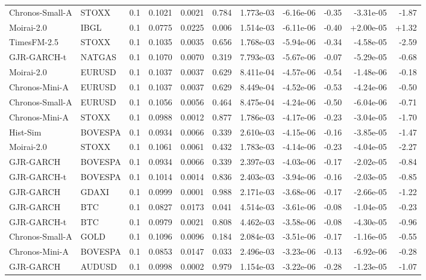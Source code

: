 \begin{tabular}{llrrrrrrrrr}
Chronos-Small-A & STOXX & 0.1 & 0.1021 & 0.0021 & 0.784 & 1.773e-03 & -6.16e-06 & -0.35 & -3.31e-05 & -1.87 \\
Moirai-2.0 & IBGL & 0.1 & 0.0775 & 0.0225 & 0.006 & 1.514e-03 & -6.11e-06 & -0.40 & +2.00e-05 & +1.32 \\
TimesFM-2.5 & STOXX & 0.1 & 0.1035 & 0.0035 & 0.656 & 1.768e-03 & -5.94e-06 & -0.34 & -4.58e-05 & -2.59 \\
GJR-GARCH-t & NATGAS & 0.1 & 0.1070 & 0.0070 & 0.319 & 7.793e-03 & -5.67e-06 & -0.07 & -5.29e-05 & -0.68 \\
Moirai-2.0 & EURUSD & 0.1 & 0.1037 & 0.0037 & 0.629 & 8.411e-04 & -4.57e-06 & -0.54 & -1.48e-06 & -0.18 \\
Chronos-Mini-A & EURUSD & 0.1 & 0.1037 & 0.0037 & 0.629 & 8.449e-04 & -4.52e-06 & -0.53 & -4.24e-06 & -0.50 \\
Chronos-Small-A & EURUSD & 0.1 & 0.1056 & 0.0056 & 0.464 & 8.475e-04 & -4.24e-06 & -0.50 & -6.04e-06 & -0.71 \\
Chronos-Mini-A & STOXX & 0.1 & 0.0988 & 0.0012 & 0.877 & 1.786e-03 & -4.17e-06 & -0.23 & -3.04e-05 & -1.70 \\
Hist-Sim & BOVESPA & 0.1 & 0.0934 & 0.0066 & 0.339 & 2.610e-03 & -4.15e-06 & -0.16 & -3.85e-05 & -1.47 \\
Moirai-2.0 & STOXX & 0.1 & 0.1061 & 0.0061 & 0.432 & 1.783e-03 & -4.14e-06 & -0.23 & -4.04e-05 & -2.27 \\
GJR-GARCH & BOVESPA & 0.1 & 0.0934 & 0.0066 & 0.339 & 2.397e-03 & -4.03e-06 & -0.17 & -2.02e-05 & -0.84 \\
GJR-GARCH-t & BOVESPA & 0.1 & 0.1014 & 0.0014 & 0.836 & 2.403e-03 & -3.94e-06 & -0.16 & -2.03e-05 & -0.85 \\
GJR-GARCH & GDAXI & 0.1 & 0.0999 & 0.0001 & 0.988 & 2.171e-03 & -3.68e-06 & -0.17 & -2.66e-05 & -1.22 \\
GJR-GARCH & BTC & 0.1 & 0.0827 & 0.0173 & 0.041 & 4.514e-03 & -3.61e-06 & -0.08 & -1.04e-05 & -0.23 \\
GJR-GARCH-t & BTC & 0.1 & 0.0979 & 0.0021 & 0.808 & 4.462e-03 & -3.58e-06 & -0.08 & -4.30e-05 & -0.96 \\
Chronos-Small-A & GOLD & 0.1 & 0.1096 & 0.0096 & 0.184 & 2.084e-03 & -3.51e-06 & -0.17 & -1.16e-05 & -0.55 \\
Chronos-Mini-A & BOVESPA & 0.1 & 0.0853 & 0.0147 & 0.033 & 2.496e-03 & -3.23e-06 & -0.13 & -6.92e-06 & -0.28 \\
GJR-GARCH & AUDUSD & 0.1 & 0.0998 & 0.0002 & 0.979 & 1.154e-03 & -3.22e-06 & -0.28 & -1.23e-05 & -1.07 \\

\end{tabular}
